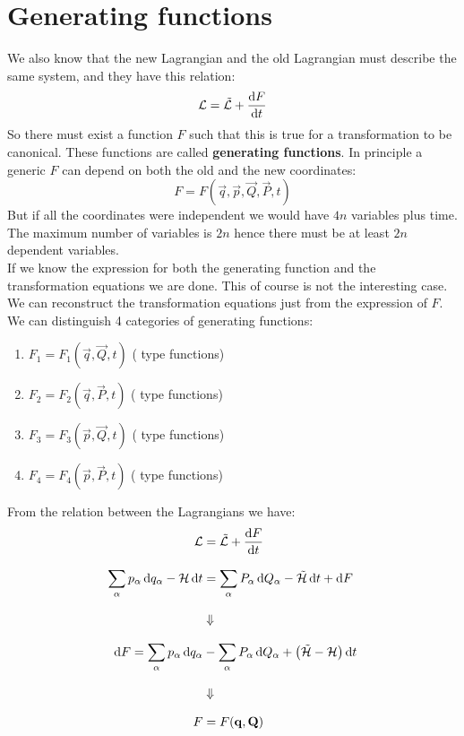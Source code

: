\section{Generating functions}
We also know that the new Lagrangian and the old Lagrangian must describe the same system, and they have this relation:
\begin{equation}
    \lagr = \tilde{\lagr}+\dv{F}{t}
\end{equation}
So there must exist a function $F$ such that this is true for a transformation to be canonical. These functions are called \textbf{generating functions}.
In principle a generic $F$ can depend on both the old and the new coordinates:
\begin{equation}
    F = F(\vec{q},\vec{p},\vec{Q},\vec{P},t)
\end{equation}
But if all the coordinates were independent we would have $4n$ variables plus time. The maximum number of variables is $2n$ hence there must be at least $2n$ dependent variables.\\
If we know the expression for both the generating function and the transformation equations we are done. This of course is not the interesting case. We can reconstruct the transformation equations just from the expression of $F$. We can distinguish 4 categories of generating functions:
\begin{enumerate}
    \item $F_1 = F_1(\vec{q},\vec{Q},t)$ ( type functions)
    \item $F_2 = F_2(\vec{q},\vec{P},t)$ (  type functions)
    \item $F_3 = F_3(\vec{p},\vec{Q},t)$ (  type functions)
    \item $F_4 = F_4(\vec{p},\vec{P},t)$ (  type functions)
\end{enumerate}
From the relation between the Lagrangians we have:
\begin{equation}
    \begin{split}
        \lagr &= \tilde{\lagr}+\dv{F}{t}\\[8pt]
        \bigsum_{\alpha}p_{\alpha}\dd{q_{\alpha}} - \hamfun\dd{t} &= \bigsum_{\alpha}P_{\alpha}\dd{Q_{\alpha}} - \tilde{\hamfun}\dd{t} + \dd{F}\\[8pt]
        &\Downarrow \\[8pt]
        \dd{F} = \bigsum_{\alpha}p_{\alpha}\dd{q_{\alpha}} &- \bigsum_{\alpha}P_{\alpha}\dd{Q_{\alpha}} + \brackets{\tilde{\hamfun}- \hamfun}\dd{t}\\[8pt]
        &\Downarrow \\[8pt]
        F &= F(\vec{q},\vec{Q})
    \end{split}
\end{equation}
